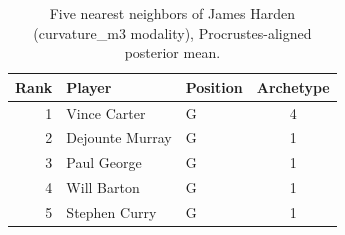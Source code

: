 \begin{table}[htbp]
  \centering\small
  \begin{tabular}{rllc}
    \toprule
    Rank & Player & Position & Archetype \\
    \midrule
    1 & Vince Carter & G & 4 \\
    2 & Dejounte Murray & G & 1 \\
    3 & Paul George & G & 1 \\
    4 & Will Barton & G & 1 \\
    5 & Stephen Curry & G & 1 \\
    \bottomrule
  \end{tabular}
  \caption{Five nearest neighbors of James Harden (curvature_m3 modality), Procrustes-aligned posterior mean.}
  \label{tab:James_Harden_neighbors_curvature_m3}
\end{table}

